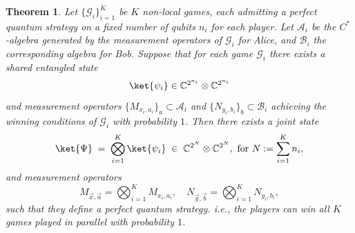 \documentclass{article}
\newtheorem{theorem}{Theorem}
\begin{document}
\begin{theorem}\label{thm: indep}
     Let $\{\mathcal{G}_i\}_{i=1}^K$ be $K$ non-local games, each admitting a perfect quantum strategy on a fixed number of qubits $n_i$ for each player. 
    Let $\mathcal{A}_i$ be the $C^*$-algebra generated by the measurement operators of $\mathcal{G}_i$ for Alice, and $\mathcal{B}_i$ the corresponding algebra for Bob. 
    Suppose that for each game $\mathcal{G}_i$ there exists a shared entangled state 
    \begin{equation}
        \ket{\psi_i} \in \mathbb{C}^{2^{n_i}} \otimes \mathbb{C}^{2^{n_i}}
    \end{equation}
    and measurement operators $\{M_{x_i,a_i}\}_a \subset \mathcal{A}_i$ and $\{N_{y_i,b_i}\}_b \subset \mathcal{B}_i$ 
    achieving the winning conditions of $\mathcal{G}_i$ with probability $1$. 
    Then there exists a joint state
    \begin{equation}
        \ket{\Psi} \;=\; \bigotimes_{i=1}^K \ket{\psi_i} \;\in\; \mathbb{C}^{2^N} \otimes \mathbb{C}^{2^N}, \text{ for } N := \sum_{i=1}^K n_i,
    \end{equation}
    and measurement operators 
    \begin{equation}
         M_{\vec{x},\vec{a}} = \bigotimes_{i=1}^K M_{x_i,a_i}, 
        \quad N_{\vec{y},\vec{b}} = \bigotimes_{i=1}^K N_{y_i,b_i},
    \end{equation}
    such that they define a perfect quantum strategy. i.e., the players can win all $K$ games played in parallel with probability $1$. 
\end{theorem}
\end{document}
